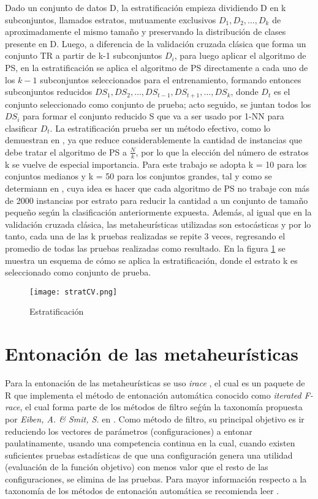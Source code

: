 Dado un conjunto de datos D, la estratificación empieza dividiendo D en k subconjuntos, llamados estratos, mutuamente exclusivos $D_1,D_2,\dots,D_k$ de aproximadamente el mismo tamaño y preservando la distribución de clases presente en D. Luego, a diferencia de la validación cruzada clásica que forma un conjunto TR a partir de k-1 subconjuntos $D_i$, para luego aplicar el algoritmo de PS, en la estratificación se aplica el algoritmo de PS directamente a cada uno de los $k-1$ subconjuntos seleccionados para el entrenamiento, formando entonces subconjuntos reducidos $DS_1,DS_2,\dots,DS_{t-1},DS_{t+1},\dots,DS_k$, donde $D_t$ es el conjunto seleccionado como conjunto de prueba; acto seguido, se juntan todos los $DS_i$ para formar el conjunto reducido S que va a ser usado por 1-NN para clasificar $D_t$. La estratificación prueba ser un método efectivo, como lo demuestran en \cite{cano2005stratification}, ya que reduce considerablemente la cantidad de instancias que debe tratar el algoritmo de PS a $\frac{N}{k}$, por lo que la elección del número de estratos k se vuelve de especial importancia. Para este trabajo se adopta k = 10 para los conjuntos medianos y k = 50 para los conjuntos grandes, tal y como se determiann en \cite{cano2005stratification}, cuya idea es hacer que cada algoritmo de PS no trabaje con más de 2000 instancias por estrato para reducir la cantidad a un conjunto de tamaño pequeño según la clasificación anteriormente expuesta. Además, al igual que en la validación cruzada clásica, las metaheurísticas utilizadas son estocásticas y por lo tanto, cada una de las k pruebas realizadas se repite 3 veces, regresando el promedio de todas las pruebas realizadas como resultado. En la figura \ref{strat} se muestra un esquema de cómo se aplica la estratificación, donde el estrato k es seleccionado como conjunto de prueba.

\begin{figure}[]
\centering
\texttt{[image: stratCV.png]}
\caption[Classic]{Estratificación}
\label{strat}
\end{figure}

\section{Entonación de las metaheurísticas}

Para la entonación de las metaheurísticas se uso \emph{irace} \cite{lopez2016irace}, el cual es un paquete de R que implementa el método de entonación automática conocido como \emph{iterated F-race}, el cual forma parte de los métodos de filtro seǵún la taxonomía propuesta por \emph{Eiben, A. \& Smit, S.} en \cite{eiben2011parameter}. Como método de filtro, su principal objetivo es ir reduciendo los vectores de parámetros (configuraciones) a entonar paulatinamente, usando una competencia continua en la cual, cuando existen suficientes pruebas estadísticas de que una configuración genera una utilidad (evaluación de la función objetivo) con menos valor que el resto de las configuraciones, se elimina de las pruebas. Para mayor información respecto a la taxonomía de los métodos de entonación automática se recomienda leer \cite{eiben2011parameter}.


